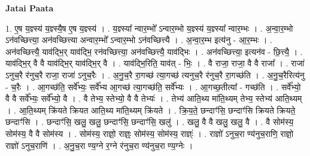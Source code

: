 \documentclass[17pt]{extarticle}
\begin{document}
\textbf{Jatai Paata} \newline

1. ए॒ष य॒ज्ञ्स्य॑ य॒ज्ञ्स्यै॒ष ए॒ष य॒ज्ञ्स्य॑ । . य॒ज्ञ्स्या᳚ न्वार॒म्भो᳚ ऽन्वार॒म्भो य॒ज्ञ्स्य॑ य॒ज्ञ्स्या᳚ न्वार॒म्भः । . अ॒न्वा॒र॒म्भो ऽन॑वच्छित्त्या॒ अन॑वच्छित्त्या अन्वार॒म्भो᳚ ऽन्वार॒म्भो ऽन॑वच्छित्त्यै । . अ॒न्वा॒र॒म्भ इत्य॑नु - आ॒र॒म्भः । . अन॑वच्छित्त्यै॒ याव॑द्भि॒र् याव॑द्भि॒ रन॑वच्छित्त्या॒ अन॑वच्छित्त्यै॒ याव॑द्भिः । . अन॑वच्छित्त्या॒ इत्यन॑व - छि॒त्त्यै॒ । . याव॑द्भि॒र् वै वै याव॑द्भि॒र् याव॑द्भि॒र् वै । . याव॑द्भि॒रिति॒ याव॑त् - भिः॒ । . वै राजा॒ राजा॒ वै वै राजा᳚ । . राजा॑ ऽनुच॒रै र॑नुच॒रै राजा॒ राजा॑ ऽनुच॒रैः । . अ॒नु॒च॒रै रा॒गच्छ॑ त्या॒गच्छ॑ त्यनुच॒रै र॑नुच॒रै रा॒गच्छ॑ति । . अ॒नु॒च॒रैरित्य॑नु - च॒रैः । . आ॒गच्छ॑ति॒ सर्वे᳚भ्यः॒ सर्वे᳚भ्य आ॒गच्छ॑ त्या॒गच्छ॑ति॒ सर्वे᳚भ्यः । . आ॒गच्छ॒तीत्या᳚ - गच्छ॑ति । . सर्वे᳚भ्यो॒ वै वै सर्वे᳚भ्यः॒ सर्वे᳚भ्यो॒ वै । . वै तेभ्य॒ स्तेभ्यो॒ वै वै तेभ्यः॑ । . तेभ्य॑ आति॒थ्य मा॑ति॒थ्यम् तेभ्य॒ स्तेभ्य॑ आति॒थ्यम् । . आ॒ति॒थ्यम् क्रि॑यते क्रियत आति॒थ्य मा॑ति॒थ्यम् क्रि॑यते । . क्रि॒य॒ते॒ छन्दाꣳ॑सि॒ छन्दाꣳ॑सि क्रियते क्रियते॒ छन्दाꣳ॑सि । . छन्दाꣳ॑सि॒ खलु॒ खलु॒ छन्दाꣳ॑सि॒ छन्दाꣳ॑सि॒ खलु॑ । . खलु॒ वै वै खलु॒ खलु॒ वै । . वै सोम॑स्य॒ सोम॑स्य॒ वै वै सोम॑स्य । . सोम॑स्य॒ राज्ञो॒ राज्ञ्ः॒ सोम॑स्य॒ सोम॑स्य॒ राज्ञ्ः॑ । . राज्ञो॑ ऽनुच॒रा ण्य॑नुच॒राणि॒ राज्ञो॒ राज्ञो॑ ऽनुच॒राणि॑ । . अ॒नु॒च॒रा ण्य॒ग्ने र॒ग्ने र॑नुच॒रा ण्य॑नुच॒रा ण्य॒ग्नेः । \newline
\end{document}
